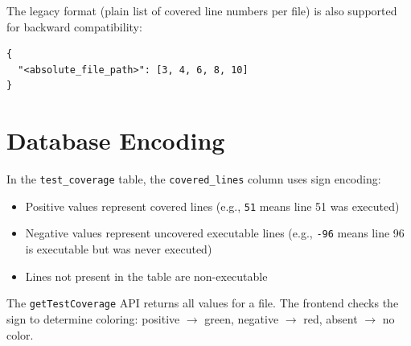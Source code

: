 The legacy format (plain list of covered line numbers per file) is also supported for backward compatibility:

\begin{lstlisting}[caption={Legacy coverage.json format}]
{
  "<absolute_file_path>": [3, 4, 6, 8, 10]
}
\end{lstlisting}

\section{Database Encoding}

In the \texttt{test\_coverage} table, the \texttt{covered\_lines} column uses sign encoding:

\begin{itemize}
    \item Positive values represent covered lines (e.g., \texttt{51} means line 51 was executed)
    \item Negative values represent uncovered executable lines (e.g., \texttt{-96} means line 96 is executable but was never executed)
    \item Lines not present in the table are non-executable
\end{itemize}

The \texttt{getTestCoverage} API returns all values for a file. The frontend checks the sign to determine coloring: positive $\rightarrow$ green, negative $\rightarrow$ red, absent $\rightarrow$ no color.
